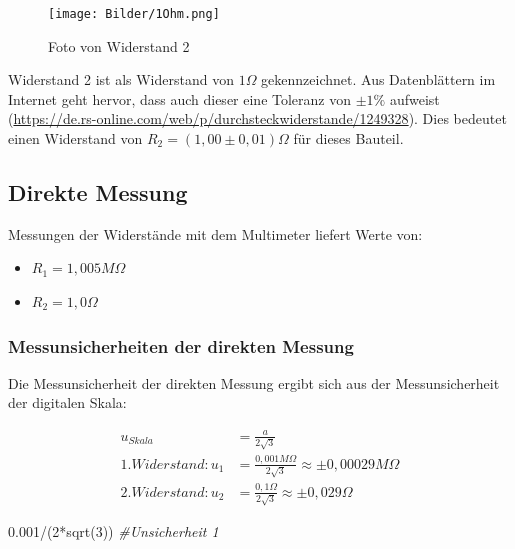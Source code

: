 \documentclass[
  9pt,
]{article}
\newenvironment{Shaded}{\begin{snugshade}}{\end{snugshade}}
\newcommand{\CommentTok}[1]{\textcolor[rgb]{0.56,0.35,0.01}{\textit{#1}}}
\newcommand{\DecValTok}[1]{\textcolor[rgb]{0.00,0.00,0.81}{#1}}
\newcommand{\FloatTok}[1]{\textcolor[rgb]{0.00,0.00,0.81}{#1}}
\newcommand{\FunctionTok}[1]{\textcolor[rgb]{0.00,0.00,0.00}{#1}}
\newcommand{\NormalTok}[1]{#1}
\newcommand{\SpecialCharTok}[1]{\textcolor[rgb]{0.00,0.00,0.00}{#1}}
\begin{document}
\begin{figure}
\centering
\texttt{[image: Bilder/1Ohm.png]}
\caption{Foto von Widerstand 2}
\end{figure}

Widerstand 2 ist als Widerstand von \(1\Omega\) gekennzeichnet. Aus
Datenblättern im Internet geht hervor, dass auch dieser eine Toleranz
von \(\pm 1 \%\) aufweist
(\url{https://de.rs-online.com/web/p/durchsteckwiderstande/1249328}).
Dies bedeutet einen Widerstand von \(R_2=(1,00 \pm 0,01)\Omega\) für
dieses Bauteil.

\hypertarget{direkte-messung}{%
\subsection{Direkte Messung}\label{direkte-messung}}

Messungen der Widerstände mit dem Multimeter liefert Werte von:

\begin{itemize}
\item $R_1 = 1,005 M\Omega$\\
\item $R_2 = 1,0 \Omega$
\end{itemize}

\hypertarget{messunsicherheiten-der-direkten-messung}{%
\subsubsection{Messunsicherheiten der direkten
Messung}\label{messunsicherheiten-der-direkten-messung}}

Die Messunsicherheit der direkten Messung ergibt sich aus der
Messunsicherheit der digitalen Skala:

\begin{equation*}
\begin{split}
u_{Skala} &=\frac{a}{2\sqrt{3}} \\
1.Widerstand: u_1 &= \frac{0,001M\Omega}{2\sqrt{3}} \approx \pm 0,00029 M\Omega \\
2.Widerstand: u_2 &= \frac{0,1\Omega}{2\sqrt{3}} \approx \pm 0,029\Omega 
\end{split}
\end{equation*}

\begin{Shaded}
\begin{Highlighting}[]
\FloatTok{0.001}\SpecialCharTok{/}\NormalTok{(}\DecValTok{2}\SpecialCharTok{*}\FunctionTok{sqrt}\NormalTok{(}\DecValTok{3}\NormalTok{)) }\CommentTok{\#Unsicherheit 1}
\end{Highlighting}
\end{Shaded}
\end{document}
